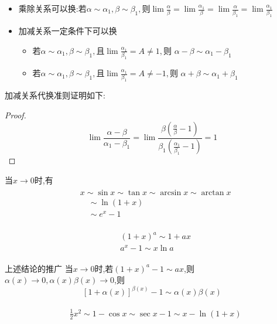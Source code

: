 \documentclass[12pt, a4paper, oneside, UTF8]{ctexbook}  %
\begin{document}
\begin{itemize}
    \item 乘除关系可以换:若$\alpha\sim\alpha_1,\beta\sim\beta_1,\text{则}\lim\frac\alpha\beta=\lim\frac{\alpha_1}\beta=\lim\frac\alpha{\beta_1}=\lim\frac{\alpha_1}{\beta_1}$
    \item 加减关系一定条件下可以换
          \begin{itemize}
              \item 若$\alpha\sim\alpha_{1},\beta\sim\beta_{1},\text{且}\operatorname*{lim}\frac{\alpha_{1}}{\beta_{1}}=A\neq1,\text{则 }\alpha-\beta\sim\alpha_{1}-\beta_{1}$
              \item 若$\alpha\sim\alpha_{1},\beta\sim\beta_{1},\text{且}\operatorname*{lim}\frac{\alpha_{1}}{\beta_{1}}=A\neq-1,\text{则 }\alpha+\beta\sim\alpha_{1}+\beta_{1}$
          \end{itemize}
\end{itemize}
加减关系代换准则证明如下:
\begin{proof}
    $$\lim \frac{\alpha-\beta}{\alpha_1 -\beta_1}=\lim \frac{\beta (\frac{\alpha}{\beta}-1)}{\beta_1(\frac{\alpha_1}{\beta_1}-1)}=1$$
\end{proof}
当$x \to 0$时,有
\begin{align*} \boxed{
        \begin{aligned}
             & x \sim \sin x \sim \tan x \sim \arcsin x \sim \arctan x \nonumber \\
             & \quad  \sim \ln (1+x)  \nonumber                                  \\
             & \quad \sim e^x -1 \nonumber
        \end{aligned} }
\end{align*}

\begin{align*} \boxed
    {
        \begin{aligned}
             & (1+x)^a \sim  1+ax   \\
             & a^x - 1 \sim x \ln a
        \end{aligned}
    }
\end{align*}
\begin{criterion}{上述结论的推广}{}
    当$x \to 0$时,若$(1+x)^a -1 \sim ax$,则$\alpha (x) \to 0,\alpha(x)\beta(x) \to 0$,则
    $$
        [1+\alpha(x)]^{\beta(x)} -1 \sim \alpha(x) \beta(x)
    $$
\end{criterion}
\begin{align*} \boxed
    {
        \begin{aligned}
             & \frac{1}{2} x^2 \sim 1-\cos x \sim \sec x -1 \sim x- \ln(1+x)
        \end{aligned}
    }
\end{align*}
\end{document}
